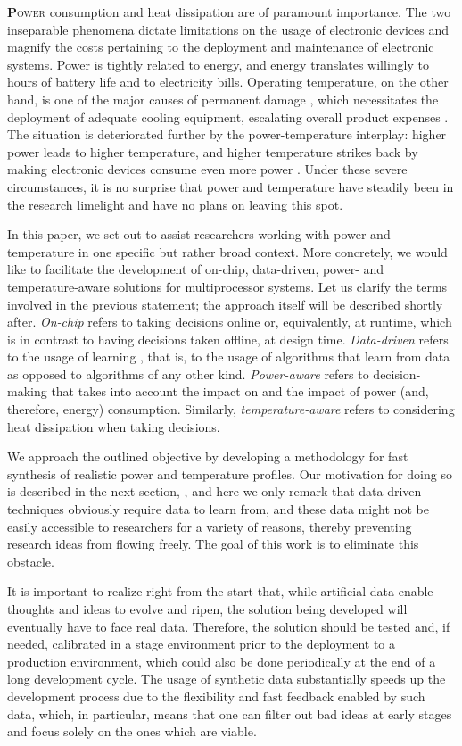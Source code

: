\lettrine[findent=0.4em, nindent=0em]{\textbf{P}}{ower} consumption and heat
dissipation are of paramount importance. The two inseparable phenomena dictate
limitations on the usage of electronic devices and magnify the costs pertaining
to the deployment and maintenance of electronic systems. Power is tightly
related to energy, and energy translates willingly to hours of battery life and
to electricity bills. Operating temperature, on the other hand, is one of the
major causes of permanent damage \cite{jedec}, which necessitates the deployment
of adequate cooling equipment, escalating overall product expenses
\cite{chaudhry2015}. The situation is deteriorated further by the
power-temperature interplay: higher power leads to higher temperature, and
higher temperature strikes back by making electronic devices consume even more
power \cite{liu2007}. Under these severe circumstances, it is no surprise that
power and temperature have steadily been in the research limelight and have no
plans on leaving this spot.

In this paper, we set out to assist researchers working with power and
temperature in one specific but rather broad context. More concretely, we would
like to facilitate the development of on-chip, data-driven, power- and
temperature-aware solutions for multiprocessor systems. Let us clarify the terms
involved in the previous statement; the approach itself will be described
shortly after. \emph{On-chip} refers to taking decisions online or,
equivalently, at runtime, which is in contrast to having decisions taken
offline, at design time. \emph{Data-driven} refers to the usage of learning
\cite{bishop2006}, that is, to the usage of algorithms that learn from data as
opposed to algorithms of any other kind. \emph{Power-aware} refers to
decision-making that takes into account the impact on and the impact of power
(and, therefore, energy) consumption. Similarly, \emph{temperature-aware} refers
to considering heat dissipation when taking decisions.

We approach the outlined objective by developing a methodology for fast
synthesis of realistic power and temperature profiles. Our motivation for doing
so is described in the next section, , and here we only remark
that data-driven techniques obviously require data to learn from, and these data
might not be easily accessible to researchers for a variety of reasons, thereby
preventing research ideas from flowing freely. The goal of this work is to
eliminate this obstacle.

It is important to realize right from the start that, while artificial data
enable thoughts and ideas to evolve and ripen, the solution being developed will
eventually have to face real data. Therefore, the solution should be tested and,
if needed, calibrated in a stage environment prior to the deployment to a
production environment, which could also be done periodically at the end of a
long development cycle. The usage of synthetic data substantially speeds up the
development process due to the flexibility and fast feedback enabled by such
data, which, in particular, means that one can filter out bad ideas at early
stages and focus solely on the ones which are viable.

